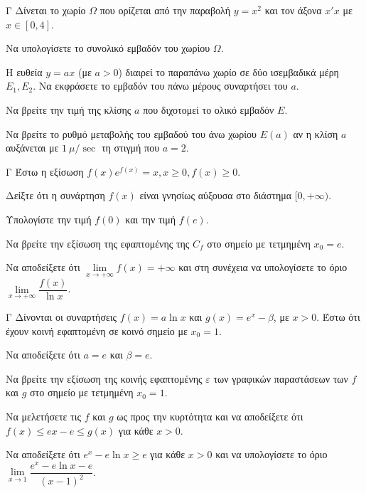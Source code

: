 \begin{thema}{Γ}
Δίνεται το χωρίο $\Omega$ που ορίζεται από την παραβολή $y = x^2$ και τον άξονα $x'x$ με $x \in [0, 4]$.
\begin{erwthma}
  \item Να υπολογίσετε το συνολικό εμβαδόν του χωρίου $\Omega$.
  \item Η ευθεία $y = a x$ (με $a > 0$) διαιρεί το παραπάνω χωρίο σε δύο ισεμβαδικά μέρη $E_1, E_2$. Να εκφράσετε το εμβαδόν του πάνω μέρους συναρτήσει του $a$.
  \item Να βρείτε την τιμή της κλίσης $a$ που διχοτομεί το ολικό εμβαδόν $E$. 
  \item Να βρείτε το ρυθμό μεταβολής του εμβαδού του άνω χωρίου $E(a)$ αν η κλίση $a$ αυξάνεται με $1\ \mu/\sec$ τη στιγμή που $a=2$.
\end{erwthma}
\end{thema}

\begin{thema}{Γ}
Έστω η εξίσωση $f(x) e^{f(x)} = x, x \ge 0, f(x) \ge 0$.
\begin{erwthma}
  \item Δείξτε ότι η συνάρτηση $f(x)$ είναι γνησίως αύξουσα στο διάστημα $[0, +\infty)$.
  \item Υπολογίστε την τιμή $f(0)$ και την τιμή $f(e)$. 
  \item Να βρείτε την εξίσωση της εφαπτομένης της $C_f$ στο σημείο με τετμημένη $x_0 = e$.
  \item Να αποδείξετε ότι $\lim\limits_{x \to +\infty} f(x) = +\infty$ και στη συνέχεια να υπολογίσετε το όριο $\lim\limits_{x \to +\infty} \dfrac{f(x)}{\ln x}$.
\end{erwthma}
\end{thema}

\begin{thema}{Γ}
Δίνονται οι συναρτήσεις $f(x) = a \ln x$ και $g(x) = e^x - \beta$, με $x > 0$. Έστω ότι έχουν κοινή εφαπτομένη σε κοινό σημείο με $x_0 = 1$.
\begin{erwthma}
  \item Να αποδείξετε ότι $a = e$ και $\beta = e$.
  \item Να βρείτε την εξίσωση της κοινής εφαπτομένης $\varepsilon$ των γραφικών παραστάσεων των $f$ και $g$ στο σημείο με τετμημένη $x_0 = 1$.
  \item Να μελετήσετε τις $f$ και $g$ ως προς την κυρτότητα και να αποδείξετε ότι $f(x) \le e x - e \le g(x)$ για κάθε $x > 0$.
  \item Να αποδείξετε ότι $e^x - e \ln x \ge e$ για κάθε $x > 0$ και να υπολογίσετε το όριο $\lim\limits_{x \to 1} \dfrac{e^x - e\ln x - e}{(x-1)^2}$.
\end{erwthma}
\end{thema}

